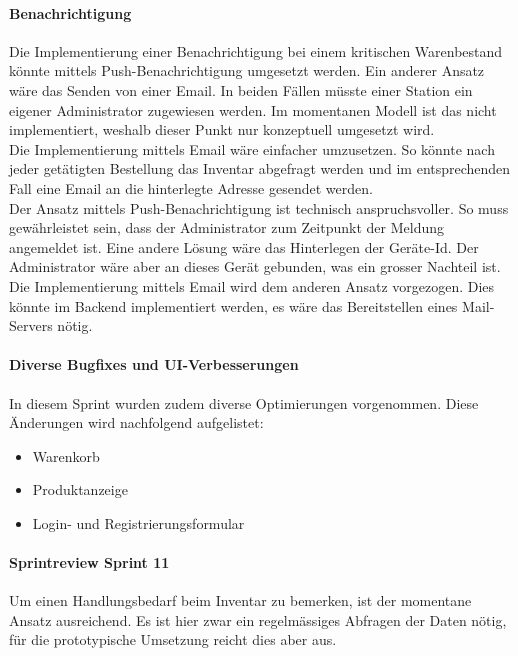 \paragraph{Benachrichtigung}
Die Implementierung einer Benachrichtigung bei einem kritischen Warenbestand könnte mittels Push-Benachrichtigung umgesetzt werden. Ein anderer Ansatz wäre das Senden von einer Email. In beiden Fällen müsste einer Station ein eigener Administrator zugewiesen werden. Im momentanen Modell ist das nicht implementiert, weshalb dieser Punkt nur konzeptuell umgesetzt wird. \\
Die Implementierung mittels Email wäre einfacher umzusetzen. So könnte nach jeder getätigten Bestellung das Inventar abgefragt werden und im entsprechenden Fall eine Email an die hinterlegte Adresse gesendet werden. \\
Der Ansatz mittels Push-Benachrichtigung ist technisch anspruchsvoller. So muss gewährleistet sein, dass der Administrator zum Zeitpunkt der Meldung angemeldet ist. Eine andere Lösung wäre das Hinterlegen der Geräte-Id. Der Administrator wäre aber an dieses Gerät gebunden, was ein grosser Nachteil ist. \\

Die Implementierung mittels Email wird dem anderen Ansatz vorgezogen. Dies könnte im Backend implementiert werden, es wäre das Bereitstellen eines Mail-Servers nötig. \\

\paragraph{Diverse Bugfixes und UI-Verbesserungen}
In diesem Sprint wurden zudem diverse Optimierungen vorgenommen. Diese Änderungen wird nachfolgend aufgelistet: 
\begin{itemize}
	\item Warenkorb
	\item Produktanzeige
	\item Login- und Registrierungsformular
\end{itemize}


\paragraph{Sprintreview Sprint 11}
Um einen Handlungsbedarf beim Inventar zu bemerken, ist der momentane Ansatz ausreichend. Es ist hier zwar ein regelmässiges Abfragen der Daten nötig, für die prototypische Umsetzung reicht dies aber aus. 

